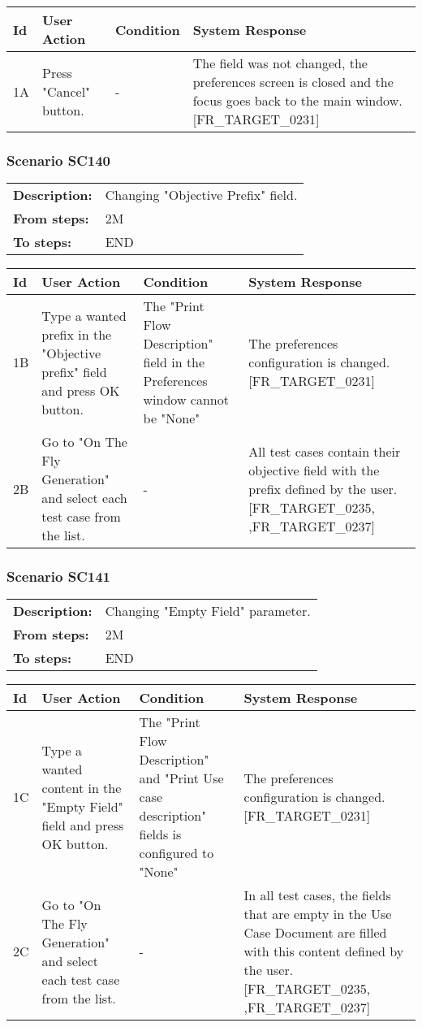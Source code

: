 \documentclass[a4paper,11pt]{article}
\newcommand{\bl}{\\ \hline}
\begin{document}
\begin{tabular}{|p{0.8in}|p{1.6in}|p{1.6in}|p{1.6in}|}
\hline
Id & User Action & Condition & System Response  \bl 
1A & Press "Cancel" button. & - & The field was not changed, the preferences screen is
						closed and the focus goes back to the main window.
						[FR_TARGET_0231] \bl 
\end{tabular}
\subsubsection*{Scenario SC140}
\begin{tabular}{p{1in}p{4in}}
{\bf Description:} & Changing "Objective Prefix" field. \\
{\bf From steps:} & 2M \\
{\bf To steps:} & END \\
\end{tabular}
 
\begin{tabular}{|p{0.8in}|p{1.6in}|p{1.6in}|p{1.6in}|}
\hline
Id & User Action & Condition & System Response  \bl 
1B & Type a wanted prefix in the "Objective prefix" field and
						press OK button. & The "Print Flow Description" field in the Preferences
						window cannot be "None" & The preferences configuration is changed.
						[FR_TARGET_0231] \bl 
2B & Go to "On The Fly Generation" and select each test case
						from the list. & - & All test cases contain their objective field with the
						prefix defined by the user. [FR_TARGET_0235, ,FR_TARGET_0237]
					 \bl 
\end{tabular}
\subsubsection*{Scenario SC141}
\begin{tabular}{p{1in}p{4in}}
{\bf Description:} & Changing "Empty Field" parameter. \\
{\bf From steps:} & 2M \\
{\bf To steps:} & END \\
\end{tabular}
 
\begin{tabular}{|p{0.8in}|p{1.6in}|p{1.6in}|p{1.6in}|}
\hline
Id & User Action & Condition & System Response  \bl 
1C & Type a wanted content in the "Empty Field" field and press
						OK button. & The "Print Flow Description" and "Print Use case
						description" fields is configured to "None" & The preferences configuration is changed.
						[FR_TARGET_0231] \bl 
2C & Go to "On The Fly Generation" and select each test case
						from the list. & - & In all test cases, the fields that are empty in the Use
						Case Document are filled with this content defined by the user.
						[FR_TARGET_0235, ,FR_TARGET_0237] \bl 
\end{tabular}
\end{document}
